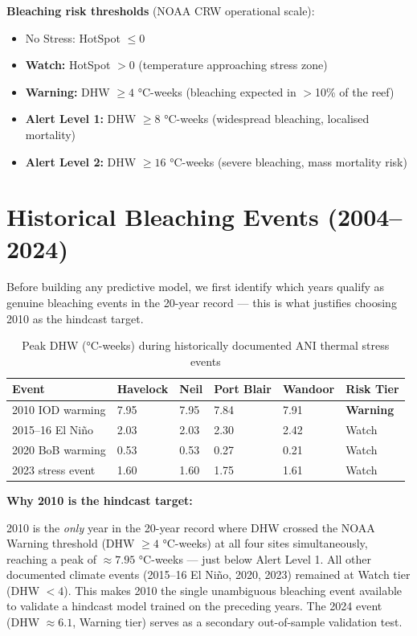 \documentclass[12pt,a4paper]{report}
\begin{document}
\textbf{Bleaching risk thresholds} (NOAA CRW operational scale):
\begin{itemize}[nosep]
  \item No Stress: HotSpot $\leq 0$
  \item \textbf{Watch:} HotSpot $> 0$ (temperature approaching stress zone)
  \item \textbf{Warning:} DHW $\geq 4$ °C-weeks (bleaching expected in $>$10\% of
  the reef)
  \item \textbf{Alert Level 1:} DHW $\geq 8$ °C-weeks (widespread bleaching,
  localised mortality)
  \item \textbf{Alert Level 2:} DHW $\geq 16$ °C-weeks (severe bleaching, mass
  mortality risk)
\end{itemize}



\section{Historical Bleaching Events (2004--2024)}
\label{sec:task2_results}

Before building any predictive model, we first identify which years qualify as
genuine bleaching events in the 20-year record --- this is what justifies choosing
2010 as the hindcast target.

\begin{table}[H]
\centering
\caption{Peak DHW (°C-weeks) during historically documented ANI thermal stress events}
\begin{tabular}{L{3.5cm}R{2.1cm}R{2.1cm}R{2.1cm}R{2.1cm}L{2.5cm}}
\toprule
\textbf{Event} & \textbf{Havelock} & \textbf{Neil} & \textbf{Port Blair} &
\textbf{Wandoor} & \textbf{Risk Tier} \\
\midrule
{}
2010 IOD warming & 7.95 & 7.95 & 7.84 & 7.91 & \textbf{Warning} \\
2015--16 El Niño & 2.03 & 2.03 & 2.30 & 2.42 & Watch \\
2020 BoB warming & 0.53 & 0.53 & 0.27 & 0.21 & Watch \\
2023 stress event & 1.60 & 1.60 & 1.75 & 1.61 & Watch \\
\bottomrule
\end{tabular}
\label{tab:event_dhw}
\end{table}

\begin{findingbox}
\textbf{Why 2010 is the hindcast target:}

2010 is the \textit{only} year in the 20-year record where DHW crossed the NOAA
Warning threshold (DHW $\geq 4$ °C-weeks) at all four sites simultaneously,
reaching a peak of $\approx 7.95$ °C-weeks --- just below Alert Level 1.
All other documented climate events (2015--16 El Niño, 2020, 2023) remained
at Watch tier (DHW $< 4$). This makes 2010 the single unambiguous bleaching
event available to validate a hindcast model trained on the preceding years.
The 2024 event (DHW $\approx 6.1$, Warning tier) serves as a secondary
out-of-sample validation test.
\end{findingbox}
\end{document}
